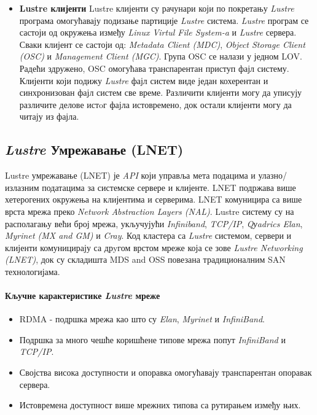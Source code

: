 \begin{itemize}
\item 
\textbf{Lustre клијенти} 
 Lustre клијенти су рачунари који по покретању \textit{Lustre} програма омогућавају подизање партиције \textit{Lustre} система. \textit{Lustre} програм се састоји од окружења између \textit{Linux Virtul File System-a} и \textit{Lustre} сервера. Сваки клијент се састоји од: \textit{Metadata Client (\gls{MDC})}, \textit{Object Storage Client (\gls{OSC})} и \textit{Management Client (\gls{MGC})}. Група OSC се налази у једном LOV. Радећи здружено, OSC  омогућава  транспарентан приступ фајл систему. Клијенти који подижу \textit{Lustre} фајл систем виде један кохерентан и синхронизован фајл систем све време. Различити клијенти могу да уписују различите делове истoг фајла истовремено, док остали клијенти могу да читају из фајла.
\end{itemize}

\subsection{\textit{Lustre} Умрежавање (\gls{LNET})}

Lustre умрежавање (LNET) је \textit{\gls{API}} који управља мета подацима и улазно/излазним податацима за системске сервере и клијенте. LNET подржава више хетерогених окружења на клијентима и серверима. LNET комуницира са више врста мрежа преко \textit{Network Abstraction Layers (\gls{NAL})}. Lustre систему су на располагању већи број мрежа, укључујући \textit{Infiniband}, \textit{TCP/IP}, \textit{Qуadrics Elan}, \textit{Myrinet (MX and GM)} и \textit{Cray}.  Код кластера са \textit{Lustre} системом, сервери и клијенти комуницирају са дрyгом врстом мреже која се зове \textit{Lustre Networking (LNET)}, док су складишта MDS and OSS повезана традиционалним SAN технологијама.

\paragraph*{Кључне карактеристике \textit{Lustre} мреже}
\begin{itemize}
\item
RDMA - подршка мрежа као што су \textit{Elan}, \textit{Myrinet} и \textit{InfiniBand}.

\item
Подршка за много чешће коришћене типове мрежа попут \textit{InfiniBand} и \textit{TCP/IP}.

\item
Својства висока доступности и опоравка омогућавају транспарентан опоравак сервера.

\item
Истовремена доступност више мрежних типова са рутирањем између њих.
\end{itemize}

